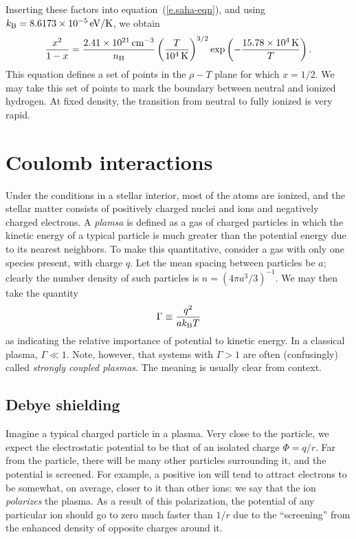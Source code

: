 Inserting these factors into equation~(\ref{e.saha-eqn}), and using $k_\mathrm{B} = 8.6173\times 10^{-5}\,\mathrm{eV}/\mathrm{K}$, we obtain
\begin{equation}\label{e.saha-reduced}
\frac{x^{2}}{1-x} = \frac{2.41\times 10^{21}\,\mathrm{c}\mathrm{m}^{-3}}{n_{\mathrm{H}}} \left(\frac{T}{10^{4}\,\mathrm{K}}\right)^{3/2}\exp\left(-\frac{15.78\times 10^{4}\,\mathrm{K}}{T}\right).
\end{equation}
This equation defines a set of points in the $\rho-T$ plane for which $x = 1/2$.  We may take this set of points to mark the boundary between neutral and ionized hydrogen. At fixed density, the transition from neutral to fully ionized is very rapid.

\section{Coulomb interactions}
Under the conditions in a stellar interior, most of the atoms are ionized, and the stellar matter consists of positively charged nuclei and ions and negatively charged electrons. A \emph{plamsa} is defined as a gas of charged particles in which the kinetic energy of a typical particle is much greater than the potential energy due to its nearest neighbors. To make this quantitative, consider a gas with only one species present, with charge $q$.  Let the mean spacing between particles be $a$; clearly the number density of such particles is $n = (4\pi a^{3}/3)^{-1}$.  We may then take the quantity
\begin{equation}\label{e.Gamma-definition}
\Gamma \equiv \frac{q^{2}}{ak_\mathrm{B} T}
\end{equation}
as indicating the relative importance of potential to kinetic energy.  In a classical plasma, $\Gamma \ll 1$.  Note, however, that systems with $\Gamma > 1$ are often (confusingly) called  \emph{strongly coupled plasmas}. The meaning is usually clear from context.

\subsection{Debye shielding}\label{s.plasma-shielding}

Imagine a typical charged particle in a plasma.  Very close to the particle, we expect the electrostatic potential to be that of an isolated charge $\Phi = q/r$. Far from the particle, there will be many other particles surrounding it, and the potential is screened. For example, a positive ion will tend to attract electrons to be somewhat, on average, closer to it than other ions: we say that the ion \emph{polarizes} the plasma.  As a result of this polarization, the potential of any particular ion should go to zero much faster than $1/r$ due to the ``screening'' from the enhanced density of opposite charges around it.

